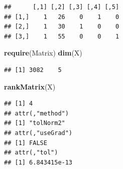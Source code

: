 \documentclass[10pt,ignorenonframetext,]{beamer}
\newenvironment{Shaded}{\begin{snugshade}}{\end{snugshade}}
\newcommand{\KeywordTok}[1]{\textcolor[rgb]{0.13,0.29,0.53}{\textbf{#1}}}
\newcommand{\DecValTok}[1]{\textcolor[rgb]{0.00,0.00,0.81}{#1}}
\newcommand{\StringTok}[1]{\textcolor[rgb]{0.31,0.60,0.02}{#1}}
\newcommand{\CommentTok}[1]{\textcolor[rgb]{0.56,0.35,0.01}{\textit{#1}}}
\newcommand{\OperatorTok}[1]{\textcolor[rgb]{0.81,0.36,0.00}{\textbf{#1}}}
\newcommand{\NormalTok}[1]{#1}
\begin{document}
\begin{frame}[fragile]

\footnotesize

\begin{Shaded}
\end{Shaded}

\begin{verbatim}
##      [,1] [,2] [,3] [,4] [,5]
## [1,]    1   26    0    1    0
## [2,]    1   30    1    0    0
## [3,]    1   55    0    0    1
\end{verbatim}

\begin{Shaded}
\begin{Highlighting}[]
\KeywordTok{require}\NormalTok{(Matrix)}
\KeywordTok{dim}\NormalTok{(X)}
\end{Highlighting}
\end{Shaded}

\begin{verbatim}
## [1] 3082    5
\end{verbatim}

\begin{Shaded}
\begin{Highlighting}[]
\KeywordTok{rankMatrix}\NormalTok{(X)}
\end{Highlighting}
\end{Shaded}

\begin{verbatim}
## [1] 4
## attr(,"method")
## [1] "tolNorm2"
## attr(,"useGrad")
## [1] FALSE
## attr(,"tol")
## [1] 6.843415e-13
\end{verbatim}

\normalsize

\end{frame}
\end{document}
